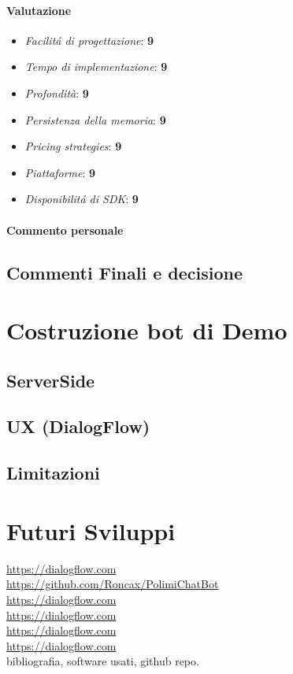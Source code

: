 \documentclass[]{article}
\begin{document}
\paragraph{Valutazione}
\begin{itemize}
\item \textit{Facilitá di progettazione}: \textbf{9} \\
\item \textit{Tempo di implementazione}: \textbf{9} \\
\item \textit{Profondità}: \textbf{9} \\
\item \textit{Persistenza della memoria}: \textbf{9} \\
\item \textit{Pricing strategies}: \textbf{9} \\
\item \textit{Piattaforme}: \textbf{9} \\
\item \textit{Disponibilitá di SDK}: \textbf{9} \\
\end{itemize}
\paragraph{Commento personale}

\subsection{Commenti Finali e decisione}


\section{Costruzione bot di Demo}
\subsection{ServerSide}
\subsection{UX (DialogFlow)}
\subsection{Limitazioni}

\section{Futuri Sviluppi}

\begin{thebibliography}{9}
\url{https://dialogflow.com} \\
\url{https://github.com/Roncax/PolimiChatBot} \\
\url{https://dialogflow.com} \\
\url{https://dialogflow.com} \\
\url{https://dialogflow.com} \\
\url{https://dialogflow.com} \\
bibliografia, software usati, github repo.
\end{thebibliography}
\end{document}
